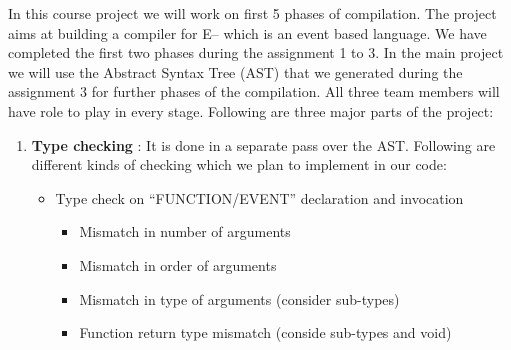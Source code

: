 \documentclass{sigchi}
\begin{document}
In this course project we will work on first 5 phases of compilation. The project aims at building a compiler for E-- which is an event based language.  We have completed the first two phases during the assignment 1 to 3. In the main project we will use the Abstract Syntax Tree (AST) that we generated during the assignment 3 for further phases of the compilation.
All three team members will have role to play in every stage. Following are three major parts of the project:
\begin{enumerate}

\item {\bf Type checking} : It is done in a separate pass over the AST. Following are different kinds of checking which we plan to implement in our code: 
	\begin{itemize}
    \item Type check on “FUNCTION/EVENT” declaration and invocation
		\begin{itemize}
    		\item Mismatch in number of arguments
			\item Mismatch in order of arguments
			\item Mismatch in type of arguments (consider sub-types)
			\item Function return type mismatch (conside sub-types and void)
        \end{itemize}
        

\end{itemize}
\end{enumerate}
\end{document}
